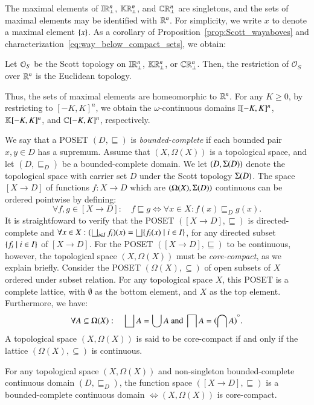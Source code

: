 \documentclass[11pt,times]{article}
\begin{document}
 
  The maximal elements of $\intvaldom[\R^n\lift]$,
  $\kCPPO{\R^n\lift}$, and $\cCPPO{\R^n\lift}$ are singletons, and the
  sets of maximal elements may be identified with $\R^n$. For
  simplicity, we write $x$ to denote a maximal element $\set{x}$. As a
  corollary of Proposition~\ref{prop:Scott_wayaboves} and
  characterization~\eqref{eq:way_below_compact_sets}, we obtain:

    \begin{corollary}
    \label{cor:Scott_restrict_Euclid}
    Let ${\cal O}_S$ be the Scott topology on $\intvaldom[\R^n\lift]$,
    $\kCPPO{\R^n\lift}$, or $\cCPPO{\R^n\lift}$. Then, the restriction
    of ${\mathcal{O}}_S$ over $\R^n$ is the Euclidean topology.
  \end{corollary}

  
  
  Thus, the sets of maximal elements are homeomorphic to $\R^n$. For
  any $K \geq 0$, by restricting to $[-K,K]^n$, we obtain the
  $\omega$-continuous domains $\intvaldom[{[-K,K]^n}]$,
  $\kCPPO{[-K,K]^n}$, and $\cCPPO{[-K,K]^n}$, respectively.

  We say that a \ac{POSET} $(D,\sqsubseteq)$ is
  \emph{bounded-complete} if each bounded pair $x,y \in D$ has a
  supremum. Assume that $(X, \Omega(X))$ is a topological space, and
  let $(D, \sqsubseteq_D)$ be a bounded-complete domain. We let
  $(D, \Scott{D})$ denote the topological space with carrier set $D$
  under the Scott topology $\Scott{D}$. The space $[X \to D]$ of
  functions $f: X \to D$ which are $(\Omega(X), \Scott{D})$ continuous
  can be ordered pointwise by defining:
%
\begin{equation*}
  \forall f, g \in [X \to D]: \quad f \sqsubseteq g \iff \forall x \in X:
  f(x) \sqsubseteq_D g(x).
\end{equation*}
%
It is straightfoward to verify that the \ac{POSET}
$([X \to D], \sqsubseteq)$ is directed-complete and
$\forall x \in X: (\lub_{i \in I} f_i)(x) = \lub
\setbarNormal{f_i(x)}{i \in I}$, for any directed subset
$\setbarNormal{f_i}{i \in I}$ of $[X \to D]$. For the \ac{POSET}
$([X \to D], \sqsubseteq)$ to be continuous, however, the topological
space $(X, \Omega(X))$ must be \emph{core-compact}, as we explain
briefly. Consider the \ac{POSET} $(\Omega(X), \subseteq)$ of open
subsets of $X$ ordered under subset relation. For any topological
space $X$, this \ac{POSET} is a complete lattice, with $\emptyset$ as
the bottom element, and $X$ as the top element. Furthermore, we have:
%
\begin{equation*}
  \forall A \subseteq \Omega(X): \quad \lub A = \bigcup A \text{ and
  } \glb A = \interiorOf{(\bigcap A)}.
\end{equation*}
%
A topological space $(X, \Omega(X))$ is said to be core-compact if and
only if the lattice $(\Omega(X), \subseteq)$ is continuous. 
%
\begin{theorem}
  \label{thm:core_compact}
  For any topological space $(X, \Omega(X))$ and non-singleton
  bounded-complete continuous domain $(D, \sqsubseteq_D)$, the
  function space $([X \to D], \sqsubseteq)$ is a bounded-complete
  continuous domain $\iff (X, \Omega(X))$ is core-compact.
\end{theorem}
\end{document}
